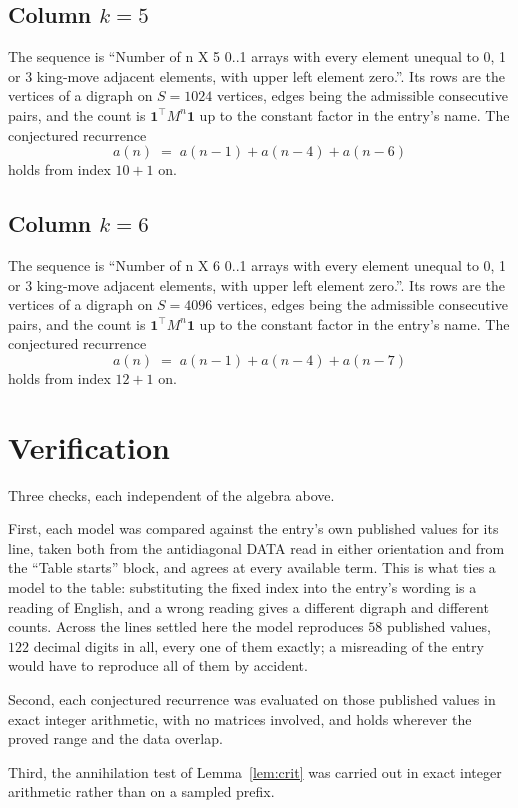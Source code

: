 \documentclass[11pt,a4paper]{article}
\theoremstyle{plain}
\theoremstyle{definition}
\begin{document}
\subsection*{Column $k$$=5$}
The sequence is ``Number of n X 5 0..1 arrays with every element unequal to 0, 1 or 3 king-move adjacent elements, with upper left element zero.''. Its rows are the vertices of a digraph on
$S=1024$ vertices, edges being the admissible consecutive pairs, and the count is
$\mathbf{1}^{\!\top}M^{n}\mathbf{1}$ up to the constant factor in the entry's name.
The conjectured recurrence
\[
a(n)\;=\;a(n-1) + a(n-4) + a(n-6)
\]
holds from index $10+1$ on.

\subsection*{Column $k$$=6$}
The sequence is ``Number of n X 6 0..1 arrays with every element unequal to 0, 1 or 3 king-move adjacent elements, with upper left element zero.''. Its rows are the vertices of a digraph on
$S=4096$ vertices, edges being the admissible consecutive pairs, and the count is
$\mathbf{1}^{\!\top}M^{n}\mathbf{1}$ up to the constant factor in the entry's name.
The conjectured recurrence
\[
a(n)\;=\;a(n-1) + a(n-4) + a(n-7)
\]
holds from index $12+1$ on.

\section{Verification}

Three checks, each independent of the algebra above.

First, each model was compared against the entry's own published values for its line, taken
both from the antidiagonal DATA read in either orientation and from the ``Table starts''
block, and agrees at every available term. This is what ties a model to the table:
substituting the fixed index into the entry's wording is a reading of English, and a wrong
reading gives a different digraph and different counts. Across the lines settled here the
model reproduces $58$ published values, $122$ decimal digits in all, every one of
them exactly; a misreading of the entry would have to reproduce all of them by accident.

Second, each conjectured recurrence was evaluated on those published values in exact
integer arithmetic, with no matrices involved, and holds wherever the proved range and the
data overlap.

Third, the annihilation test of Lemma~\ref{lem:crit} was carried out in exact integer
arithmetic rather than on a sampled prefix.
\end{document}
